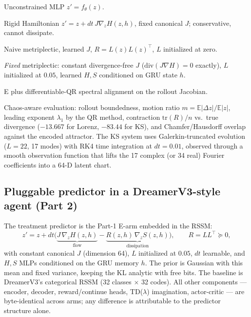 \documentclass[preprint,12pt]{article}
\begin{document}
\begin{description}[leftmargin=1.2em,itemsep=1pt]
  \item[B] Unconstrained MLP $z' = f_\theta(z)$.
  \item[C] Rigid Hamiltonian $z' = z + dt\,J\nabla_z H(z,h)$, fixed
  canonical $J$; conservative, cannot dissipate.
  \item[D] Naive metriplectic, learned $J$, $R = L(z)L(z)^\top$,
  $L$ initialized at zero.
  \item[E] \emph{Fixed} metriplectic: constant divergence-free $J$
  ($\mathrm{div}(J\nabla H)=0$ exactly), $L$ initialized at $0.05$,
  learned $H,S$ conditioned on GRU state $h$.
  \item[F] E plus differentiable-QR spectral alignment on the rollout
  Jacobian.
\end{description}

Chaos-aware evaluation: rollout boundedness, motion ratio
$m = \mathbb{E}|\Delta z|/\mathbb{E}|z|$, leading exponent $\lambda_1$ by
the QR method, contraction $\mathrm{tr}(R)/n$ vs.\ true divergence
($-13.667$ for Lorenz, $-83.44$ for KS), and Chamfer/Hausdorff overlap
against the encoded attractor. The KS system uses Galerkin-truncated
evolution ($L=22$, 17 modes) with RK4 time integration at $dt=0.01$,
observed through a smooth observation function that lifts the 17 complex
(or 34 real) Fourier coefficients into a 64-D latent chart.

\subsection{Pluggable predictor in a DreamerV3-style agent (Part 2)}

The treatment predictor is the Part-1 E-arm embedded in the RSSM:
\begin{equation}
  z' = z + dt\big(\underbrace{J\,\nabla_z H(z,h)}_{\text{flow}}
       - \underbrace{R(z,h)\,\nabla_z S(z,h)}_{\text{dissipation}}\big),
  \qquad R = LL^\top \succeq 0,
\end{equation}
with constant canonical $J$ (dimension 64), $L$ initialized at $0.05$,
$dt$ learnable, and $H,S$ MLPs conditioned on the GRU memory $h$. The
prior is Gaussian with this mean and fixed variance, keeping the KL
analytic with free bits. The baseline is DreamerV3's categorical RSSM
(32 classes $\times$ 32 codes). All other components --- encoder,
decoder, reward/continue heads, TD($\lambda$) imagination, actor-critic ---
are byte-identical across arms; any difference is attributable to the
predictor structure alone.
\end{document}
